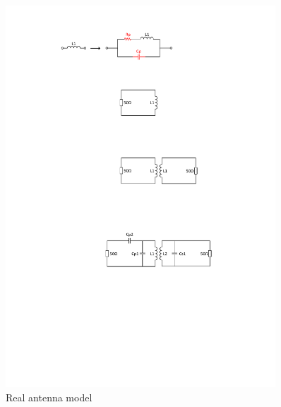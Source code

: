 \documentclass[12pt,a4paper,UKenglish]{article}
\begin{document}
\begin{figure}[!htbp] %
   \centering
   \includegraphics[width=0.9\textwidth]{img/ant_non_ideal.pdf} 
   \caption{Real antenna model}
   \label{fig:ant_non_ideal}
\end{figure}
\end{document}

